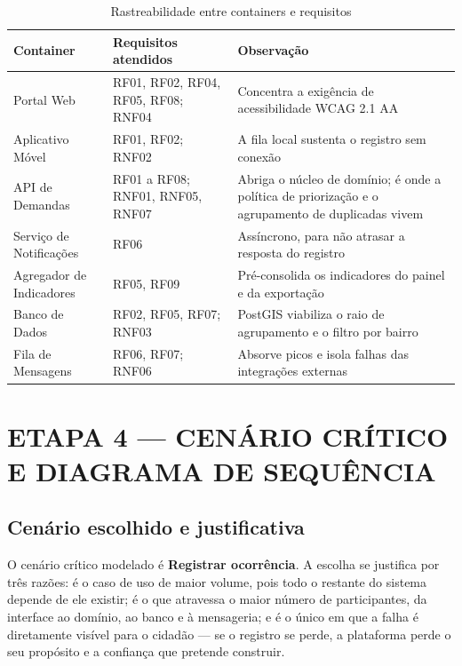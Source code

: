 \documentclass[12pt,a4paper,oneside]{article}
\newcommand{\fonte}[1]{\par\vspace{5pt}{\footnotesize\singlespacing Fonte: #1\par}}
\newcommand{\cab}[1]{\textbf{\footnotesize #1}}
\begin{document}
\begin{table}[H]
\centering
\caption{Rastreabilidade entre containers e requisitos}
\label{tab:alinhamento}
{\small\singlespacing
\begin{tabularx}{\textwidth}{L{3.2cm} L{3.4cm} X}
\toprule
\cab{Container} & \cab{Requisitos atendidos} & \cab{Observação} \\
\midrule
Portal Web & RF01, RF02, RF04, RF05, RF08; RNF04 & Concentra a exigência de
acessibilidade WCAG 2.1 AA \\
Aplicativo Móvel & RF01, RF02; RNF02 & A fila local sustenta o registro sem
conexão \\
API de Demandas & RF01 a RF08; RNF01, RNF05, RNF07 & Abriga o núcleo de
domínio; é onde a política de priorização e o agrupamento de duplicadas vivem \\
Serviço de Notificações & RF06 & Assíncrono, para não atrasar a resposta do
registro \\
Agregador de Indicadores & RF05, RF09 & Pré-consolida os indicadores do painel
e da exportação \\
Banco de Dados & RF02, RF05, RF07; RNF03 & PostGIS viabiliza o raio de
agrupamento e o filtro por bairro \\
Fila de Mensagens & RF06, RF07; RNF06 & Absorve picos e isola falhas das
integrações externas \\
\bottomrule
\end{tabularx}}
\fonte{elaborado pelos autores (2026).}
\end{table}

\section{ETAPA 4 — CENÁRIO CRÍTICO E DIAGRAMA DE SEQUÊNCIA}
\label{sec:etapa4}

\subsection{Cenário escolhido e justificativa}

O cenário crítico modelado é \textbf{Registrar ocorrência}. A escolha se
justifica por três razões: é o caso de uso de maior volume, pois todo o restante
do sistema depende de ele existir; é o que atravessa o maior número de
participantes, da interface ao domínio, ao banco e à mensageria; e é o único em
que a falha é diretamente visível para o cidadão — se o registro se perde, a
plataforma perde o seu propósito e a confiança que pretende construir.
\end{document}
